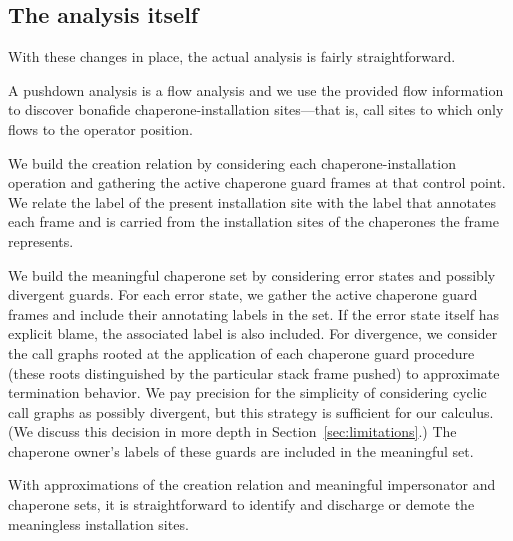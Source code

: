 \subsection{The analysis itself}

With these changes in place, the actual analysis is fairly straightforward.

A pushdown analysis is a flow analysis and we use the provided flow information to discover bonafide chaperone-installation sites---that is, call sites to which only  flows to the operator position.

We build the creation relation by considering each chaperone-installation operation and gathering the active chaperone guard frames at that control point.
We relate the label of the present installation site with the label that annotates each frame and is carried from the installation sites of the chaperones the frame represents.

We build the meaningful chaperone set by considering error states and possibly divergent guards.
For each error state, we gather the active chaperone guard frames and include their annotating labels in the set.
If the error state itself has explicit blame, the associated label is also included.
For divergence, we consider the call graphs rooted at the application of each chaperone guard procedure (these roots distinguished by the particular stack frame pushed) to approximate termination behavior.
We pay precision for the simplicity of considering cyclic call graphs as possibly divergent, but this strategy is sufficient for our calculus.
(We discuss this decision in more depth in Section~\ref{sec:limitations}.)
The chaperone owner's labels of these guards are included in the meaningful set.

With approximations of the creation relation and meaningful impersonator and chaperone sets, it is straightforward to identify and discharge or demote the meaningless installation sites.





